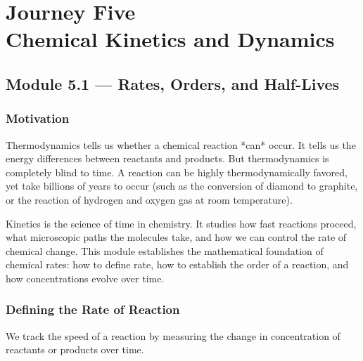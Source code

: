 \documentclass[12pt, a4paper]{book}
\begin{document}
\setcounter{chapter}{4}
\chapter[Journey 5 --- Chemical Kinetics and Dynamics]
        {Journey Five\\[8pt]
         \textcolor{ModuleColor}{\large Chemical Kinetics and Dynamics}}
\setcounter{section}{0}

\section{Module 5.1 --- Rates, Orders, and Half-Lives}
\label{sec:mod5.1}

\subsection*{Motivation}

Thermodynamics tells us whether a chemical reaction *can* occur. It tells us the energy differences between reactants and products.
But thermodynamics is completely blind to time.
A reaction can be highly thermodynamically favored, yet take billions of years to occur (such as the conversion of diamond to graphite, or the reaction of hydrogen and oxygen gas at room temperature).

Kinetics is the science of time in chemistry.
It studies how fast reactions proceed, what microscopic paths the molecules take, and how we can control the rate of chemical change.
This module establishes the mathematical foundation of chemical rates: how to define rate, how to establish the order of a reaction, and how concentrations evolve over time.

\subsection{Defining the Rate of Reaction}

We track the speed of a reaction by measuring the change in concentration of reactants or products over time.
\end{document}
